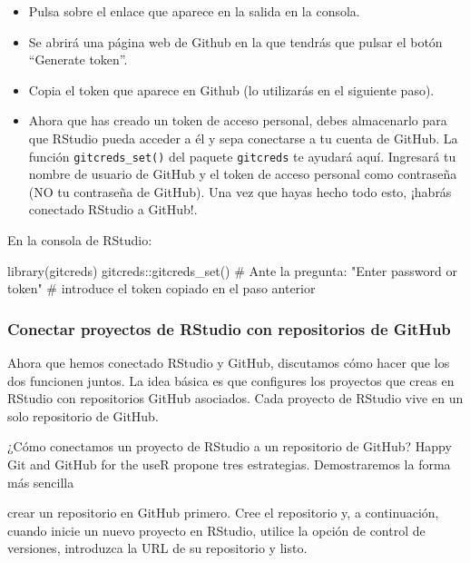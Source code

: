 \documentclass[
  letterpaper,
  DIV=11,
  numbers=noendperiod]{scrreprt}
\newenvironment{Shaded}{\begin{snugshade}}{\end{snugshade}}
\newcommand{\CommentTok}[1]{\textcolor[rgb]{0.37,0.37,0.37}{#1}}
\newcommand{\FunctionTok}[1]{\textcolor[rgb]{0.28,0.35,0.67}{#1}}
\newcommand{\NormalTok}[1]{\textcolor[rgb]{0.00,0.23,0.31}{#1}}
\newcommand{\SpecialCharTok}[1]{\textcolor[rgb]{0.37,0.37,0.37}{#1}}
\begin{document}
\begin{itemize}
\item
  Pulsa sobre el enlace que aparece en la salida en la consola.
\item
  Se abrirá una página web de Github en la que tendrás que pulsar el
  botón ``Generate token''.
\item
  Copia el token que aparece en Github (lo utilizarás en el siguiente
  paso).
\item
  Ahora que has creado un token de acceso personal, debes almacenarlo
  para que RStudio pueda acceder a él y sepa conectarse a tu cuenta de
  GitHub. La función \texttt{gitcreds\_set()} del paquete
  \texttt{gitcreds} te ayudará aquí. Ingresará tu nombre de usuario de
  GitHub y el token de acceso personal como contraseña (NO tu contraseña
  de GitHub). Una vez que hayas hecho todo esto, ¡habrás conectado
  RStudio a GitHub!.
\end{itemize}

En la consola de RStudio:

\begin{Shaded}
\begin{Highlighting}[]
\FunctionTok{library}\NormalTok{(gitcreds)}
\NormalTok{gitcreds}\SpecialCharTok{::}\FunctionTok{gitcreds\_set}\NormalTok{()}
\CommentTok{\# Ante la pregunta: "Enter password or token"}
\CommentTok{\# introduce el token copiado en el paso anterior}
\end{Highlighting}
\end{Shaded}

\hypertarget{conectar-proyectos-de-rstudio-con-repositorios-de-github}{%
\subsubsection{Conectar proyectos de RStudio con repositorios de
GitHub}\label{conectar-proyectos-de-rstudio-con-repositorios-de-github}}

Ahora que hemos conectado RStudio y GitHub, discutamos cómo hacer que
los dos funcionen juntos. La idea básica es que configures los proyectos
que creas en RStudio con repositorios GitHub asociados. Cada proyecto de
RStudio vive en un solo repositorio de GitHub.

¿Cómo conectamos un proyecto de RStudio a un repositorio de GitHub?
Happy Git and GitHub for the useR propone tres estrategias.
Demostraremos la forma más sencilla

crear un repositorio en GitHub primero. Cree el repositorio y, a
continuación, cuando inicie un nuevo proyecto en RStudio, utilice la
opción de control de versiones, introduzca la URL de su repositorio y
listo.
\end{document}
